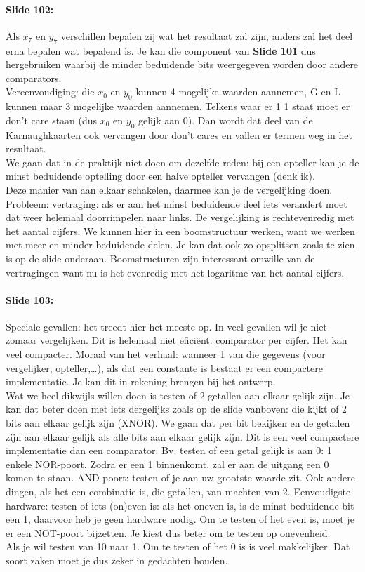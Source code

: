\documentclass[10pt,a4paper]{book}
\begin{document}
\paragraph{Slide 102:} Als $x_7$ en $y_7$ verschillen bepalen zij wat het resultaat zal zijn, anders zal het deel erna bepalen wat bepalend is. Je kan die component van \textbf{Slide 101} dus hergebruiken waarbij de minder beduidende bits weergegeven worden door andere comparators.\\
Vereenvoudiging: die $x_0$ en $y_0$ kunnen 4 mogelijke waarden aannemen, G en L kunnen maar 3 mogelijke waarden aannemen. Telkens waar er 1 1 staat moet er don't care staan (dus $x_0$ en $y_0$ gelijk aan 0). Dan wordt dat deel van de Karnaughkaarten ook vervangen door don't cares en vallen er termen weg in het resultaat.\\
We gaan dat in de praktijk niet doen om dezelfde reden: bij een opteller kan je de minst beduidende optelling door een halve opteller vervangen (denk ik).\\
Deze manier van aan elkaar schakelen, daarmee kan je de vergelijking doen. Probleem: vertraging: als er aan het minst beduidende deel iets verandert moet dat weer helemaal doorrimpelen naar links. De vergelijking is rechtevenredig met het aantal cijfers. We kunnen hier in een boomstructuur werken, want we werken met meer en minder beduidende delen. Je kan dat ook zo opsplitsen zoals te zien is op de slide onderaan. Boomstructuren zijn interessant omwille van de vertragingen want nu is het evenredig met het logaritme van het aantal cijfers.

\paragraph{Slide 103:} Speciale gevallen: het treedt hier het meeste op. In veel gevallen wil je niet zomaar vergelijken. Dit is helemaal niet efici\"ent: comparator per cijfer. Het kan veel compacter. Moraal van het verhaal: wanneer 1 van die gegevens (voor vergelijker, opteller,\ldots), als dat een constante is bestaat er een compactere implementatie. Je kan dit in rekening brengen bij het ontwerp.\\
Wat we heel dikwijls willen doen is testen of 2 getallen aan elkaar gelijk zijn. Je kan dat beter doen met iets dergelijks zoals op de slide vanboven: die kijkt of 2 bits aan elkaar gelijk zijn (XNOR). We gaan dat per bit bekijken en de getallen zijn aan elkaar gelijk als alle bits aan elkaar gelijk zijn. Dit is een veel compactere implementatie dan een comparator. Bv. testen of een getal gelijk is aan 0: 1 enkele NOR-poort. Zodra er een 1 binnenkomt, zal er aan de uitgang een 0 komen te staan. AND-poort: testen of je aan uw grootste waarde zit. Ook andere dingen, als het een combinatie is, die getallen, van machten van 2. Eenvoudigste hardware: testen of iets (on)even is: als het oneven is, is de minst beduidende bit een 1, daarvoor heb je geen hardware nodig. Om te testen of het even is, moet je er een NOT-poort bijzetten. Je kiest dus beter om te testen op onevenheid.\\
Als je wil testen van 10 naar 1. Om te testen of het 0 is is veel makkelijker. Dat soort zaken moet je dus zeker in gedachten houden.
\end{document}
